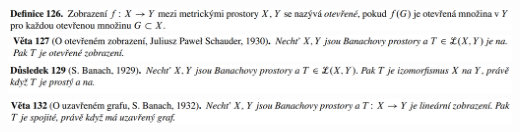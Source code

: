\documentclass[12pt,a4paper]{article}
\begin{document}
\begin{center}
		\includegraphics[width=\textwidth]{img/2banHilb/2020-06-20 17 30 11.png}\vspace{0.3cm}
		\includegraphics[width=\textwidth]{img/2banHilb/2020-06-20 17 30 19.png}\vspace{0.3cm}
		\includegraphics[width=\textwidth]{img/2banHilb/2020-06-20 17 30 34.png}\vspace{0.3cm}
		\includegraphics[width=\textwidth]{img/2banHilb/2020-06-20 17 30 49.png}\vspace{0.3cm}
	\end{center}
\end{document}
